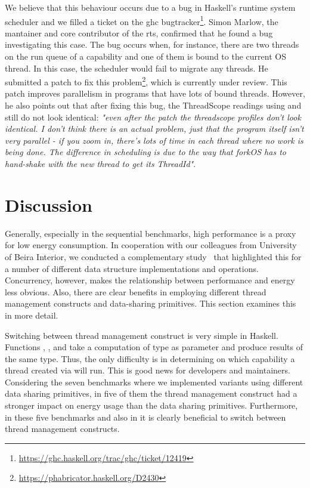 We believe that this behaviour occurs due to a bug in Haskell's runtime system scheduler and we filled a ticket on the \ac{ghc} bugtracker\footnote{\url{https://ghc.haskell.org/trac/ghc/ticket/12419}}. Simon Marlow, the mantainer and core contributor of the \acl{rts}, confirmed that he found a bug investigating this case. The bug occurs when, for instance, there are two threads on the run queue of a capability and one of them is bound to the current OS thread. In this case, the scheduler would fail to migrate any threads. He submitted a patch to fix this problem\footnote{\url{https://phabricator.haskell.org/D2430}}, which is currently under review. This patch improves parallelism in programs that have lots of bound threads. However, he also points out that after fixing this bug, the ThreadScope readings using \forkIO and \forkOS still do not look identical: \emph{"even after the patch the threadscope profiles don't look identical. I don't think there is an actual problem, just that the program itself isn't very parallel - if you zoom in, there's lots of time in each thread where no work is being done. The difference in scheduling is due to the way that forkOS has to hand-shake with the new thread to get its ThreadId"}.


\section{Discussion}\label{sec:discussion}
Generally, especially in the sequential benchmarks, high performance is a proxy for low energy consumption. In cooperation with our colleagues from University of Beira Interior, we conducted a complementary study~\cite{lima:2016} that highlighted this for a number of different data structure implementations and operations. Concurrency, however, makes the relationship between performance and energy less obvious. Also, there are clear benefits in employing  different thread management constructs and data-sharing primitives. This section examines this in more detail.

Switching between thread management construct is very simple in Haskell. Functions \forkOn, \forkIO, and \forkOS take a computation of type \IO as parameter and produce results of the same type. Thus, the only difficulty is in determining on which capability a thread created via \forkOn will run. This is good news for developers and maintainers. Considering the seven benchmarks where we implemented variants using different data sharing primitives, in five of them the thread management construct had a stronger impact on energy usage than the data sharing primitives. Furthermore, in these five benchmarks and also in \warp it is clearly beneficial to switch between thread management constructs.


